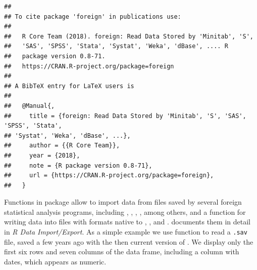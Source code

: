\documentclass[krantz2]{krantz}\usepackage{knitr}%
\begin{document}
\begin{knitrout}\footnotesize
{}\color{fgcolor}\begin{kframe}
\begin{alltt}
\hlstd{(} \hlstd{=} \hlstd{)}
\end{alltt}
\begin{verbatim}
## 
## To cite package 'foreign' in publications use:
## 
##   R Core Team (2018). foreign: Read Data Stored by 'Minitab', 'S',
##   'SAS', 'SPSS', 'Stata', 'Systat', 'Weka', 'dBase', .... R
##   package version 0.8-71.
##   https://CRAN.R-project.org/package=foreign
## 
## A BibTeX entry for LaTeX users is
## 
##   @Manual{,
##     title = {foreign: Read Data Stored by 'Minitab', 'S', 'SAS', 'SPSS', 'Stata',
## 'Systat', 'Weka', 'dBase', ...},
##     author = {{R Core Team}},
##     year = {2018},
##     note = {R package version 0.8-71},
##     url = {https://CRAN.R-project.org/package=foreign},
##   }
\end{verbatim}
\end{kframe}
\end{knitrout}

Functions in package  allow to import data from files saved by several foreign statistical analysis programs, including , , , ,  among others, and a function for writing data into files with formats native to , , and . \Rlang documents them in detail in \emph{R Data Import/Export}. As a simple example we use function  to read a \texttt{.sav} file, saved a few years ago with the then current version of . We display only the first six rows and seven columns of the data frame, including a column with dates, which appears as numeric.
\end{document}
